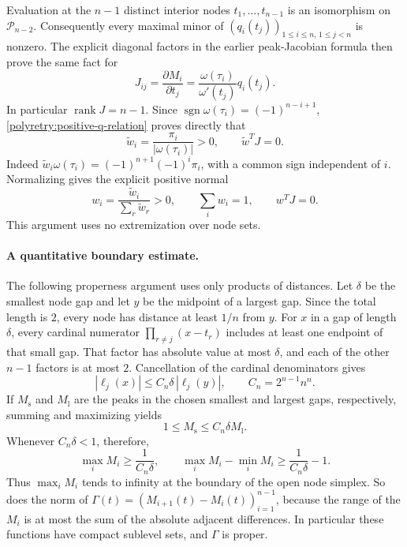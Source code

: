 \documentclass[11pt]{article}
\newcommand{\rank}{\operatorname{rank}}
\theoremstyle{remark}
\numberwithin{equation}{section}
\begin{document}
Evaluation at the $n-1$ distinct interior nodes
$t_1,\ldots,t_{n-1}$ is an isomorphism on
$\mathcal P_{n-2}$.  Consequently every maximal minor of
$(q_i(t_j))_{1\le i\le n,\,1\le j<n}$ is nonzero.
The explicit diagonal factors in the earlier peak-Jacobian
formula then prove the same fact for
\begin{equation}\label{polyretry:peak-jacobian}
 J_{ij}=\frac{\partial M_i}{\partial t_j}
       =\frac{\omega(\tau_i)}{\omega'(t_j)}q_i(t_j).
\end{equation}
In particular $\rank J=n-1$.  Since
$\operatorname{sgn}\omega(\tau_i)=(-1)^{n-i+1}$,
\eqref{polyretry:positive-q-relation} proves directly that
\[
 \widetilde w_i=\frac{\pi_i}{|\omega(\tau_i)|}>0,
 \qquad \widetilde w^TJ=0.
\]
Indeed
$\widetilde w_i\omega(\tau_i)=(-1)^{n+1}(-1)^i\pi_i$,
with a common sign independent of $i$.  Normalizing gives
the explicit positive normal
\begin{equation}\label{polyretry:positive-normal}
 w_i=\frac{\widetilde w_i}{\sum_r\widetilde w_r}>0,
 \qquad\sum_iw_i=1,\qquad w^TJ=0.
\end{equation}
This argument uses no extremization over node sets.

\paragraph{A quantitative boundary estimate.}
The following properness argument uses only products of
distances.  Let $\delta$ be the smallest node gap and let $y$
be the midpoint of a largest gap.  Since the total length is
$2$, every node has distance at least $1/n$ from $y$.
For $x$ in a gap of length $\delta$, every cardinal numerator
$\prod_{r\ne j}(x-t_r)$ includes at least one endpoint of
that small gap.  That factor has absolute value at most
$\delta$, and each of the other $n-1$ factors is at most $2$.
Cancellation of the cardinal denominators gives
\[
 |\ell_j(x)|\le C_n\delta\,|\ell_j(y)|,
 \qquad C_n=2^{n-1}n^n.
\]
If $M_{\mathrm{s}}$ and $M_{\mathrm{l}}$ are the peaks in
the chosen smallest and largest gaps, respectively, summing
and maximizing yields
\[
 1\le M_{\mathrm{s}}\le C_n\delta M_{\mathrm{l}}.
\]
Whenever $C_n\delta<1$, therefore,
\begin{equation}\label{polyretry:properness}
 \max_i M_i\ge\frac1{C_n\delta},\qquad
 \max_i M_i-\min_i M_i\ge\frac1{C_n\delta}-1.
\end{equation}
Thus $\max_i M_i$ tends to infinity at the boundary of the
open node simplex.  So does the norm of
$\Gamma(t)=(M_{i+1}(t)-M_i(t))_{i=1}^{n-1}$, because the
range of the $M_i$ is at most the sum of the absolute adjacent
differences.  In particular these functions have compact
sublevel sets, and $\Gamma$ is proper.
\end{document}
